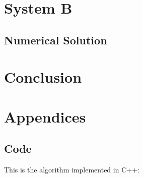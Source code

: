\documentclass{article}
\begin{document}
\newpage

\section{System B}

\subsection{Numerical Solution}

\newpage

\section{Conclusion}

\newpage



\newpage

\appendix
\section{Appendices}
\subsection{Code} \label{app:code}
This is the algorithm implemented in C++:
%
\end{document}
